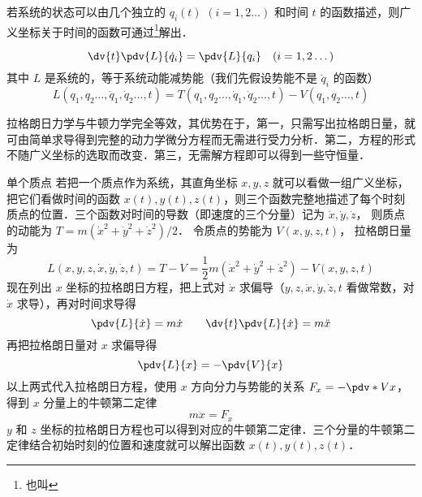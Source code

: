 

若系统的状态可以由几个独立的 $q_i(t)$ $(i=1,2\dots)$ 和时间 $t$ 的函数描述，则广义坐标关于时间的函数可通过\footnote{也叫}解出．

\begin{equation}\label{Lagrng_eq1}
\dv{t} \pdv{L}{\dot q_i} = \pdv{L}{q_i}
\quad (i=1,2\dots)
\end{equation}
其中 $L$ 是系统的，等于系统动能减势能（我们先假设势能不是 $\dot q_i$ 的函数）
\begin{equation}\label{Lagrng_eq2}
L(q_1,q_2\dots,\dot q_1,\dot q_2\dots,t) = T(q_1,q_2\dots,\dot q_1,\dot q_2\dots,t) - V(q_1,q_2\dots, t)
\end{equation}


拉格朗日力学与牛顿力学完全等效，其优势在于，第一，只需写出拉格朗日量，就可由简单求导得到完整的动力学微分方程而无需进行受力分析．第二，方程的形式不随广义坐标的选取而改变．第三，无需解方程即可以得到一些守恒量．

\begin{exam}{单个质点}\label{Lagrng_ex1}
若把一个质点作为系统，其直角坐标 $x,y,z$ 就可以看做一组广义坐标，把它们看做时间的函数 $x(t), y(t), z(t)$，则三个函数完整地描述了每个时刻质点的位置．三个函数对时间的导数（即速度的三个分量）记为 $\dot x, \dot y, \dot z$， 则质点的动能为 $T=m(\dot x^2+\dot y^2+\dot z^2)/2$． 令质点的势能为 $V(x,y,z,t)$， 拉格朗日量为
\begin{equation}
L(x,y,z, \dot x, \dot y, \dot z, t) = T-V = \frac12 m(\dot x^2+\dot y^2+\dot z^2) - V(x,y,z,t)
\end{equation}
现在列出 $x$ 坐标的拉格朗日方程，把上式对 $\dot x$ 求偏导（$y,z, \dot x, \dot y, \dot z, t$ 看做常数，对 $\dot x$ 求导），再对时间求导得
\begin{equation}
\pdv{L}{\dot x} = m\dot x
\qquad
\dv{t} \pdv{L}{\dot x} = m\ddot x
\end{equation}
再把拉格朗日量对 $x$ 求偏导得
\begin{equation}
\pdv{L}{x} = -\pdv{V}{x}
\end{equation}
以上两式代入拉格朗日方程，使用 $x$ 方向分力与势能的关系 $F_x = -\pdv*{V}{x}$， 得到 $x$ 分量上的牛顿第二定律
\begin{equation}
m\ddot x = F_x
\end{equation}
$y$ 和 $z$ 坐标的拉格朗日方程也可以得到对应的牛顿第二定律．三个分量的牛顿第二定律结合初始时刻的位置和速度就可以解出函数 $x(t), y(t), z(t)$． 
\end{exam}

